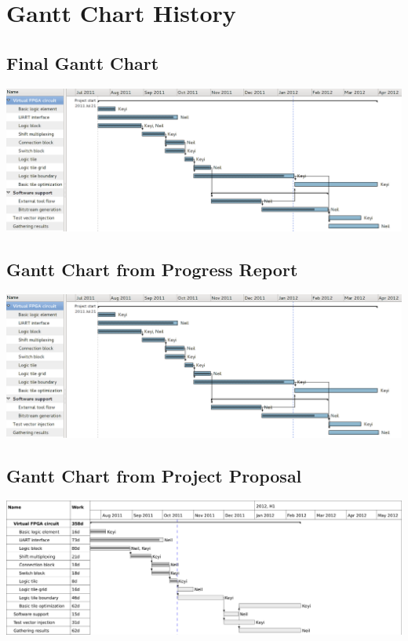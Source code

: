 \section{Gantt Chart History}

\subsection{Final Gantt Chart}
\includegraphics[scale=0.45,angle=90]{gantt-final.png}
\label{gantt-final}

\subsection{Gantt Chart from Progress Report}
\includegraphics[scale=0.45,angle=90]{gantt-progress.png}
\label{gantt-progress}

\subsection{Gantt Chart from Project Proposal}
\label{gantt-proposal}
\includegraphics[scale=1.0,angle=90]{gantt-proposal.png}

